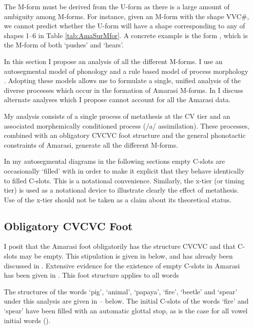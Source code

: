 The M-form must be derived from the U-form
as there is a large amount of ambiguity among M-forms.
For instance, given an M-form with the shape VVC{\#},
we cannot predict whether the U-form will have a shape
corresponding to any of shapes 1--6 in Table \ref{tab:AmaSurMfor}.
A concrete example is the form ,
which is the M-form of both
 `pushes' and  `hears'.

In this section I propose an analysis of all the different M-forms.
I use an autosegmental model of phonology \citep{go76}
and a rule based model of process morphology \citep{ma74,an92}.
Adopting these models allows me to formulate a single, unified
analysis of the diverse processes which occur in the formation of Amarasi M-forms.
In  I discuss alternate analyses
which I propose cannot account for all the Amarasi data.

My analysis consists of a single process of metathesis at the CV tier
and an associated morphemically conditioned process (/a/ assimilation).
These processes, combined with an obligatory CVCVC foot structure
and the general phonotactic constraints of Amarasi,
generate all the different M-forms.

In my autosegmental diagrams in the following sections
empty C-slots are occasionally `filled' with {\0}
in order to make it explicit that they behave identically to filled C-slots.
This is a notational convenience.
Similarly, the x-tier (or timing tier) is used as a notational device to
illustrate clearly the effect of metathesis.
Use of the x-tier should not be taken as a claim about its theoretical status.

\subsection{Obligatory CVCVC Foot}\label{sec:ThePhoRul}
I posit that the Amarasi foot obligatorily has the structure CVCVC
and that C-slots may be empty.
This stipulation is given in  below,
and has already been discussed in .
Extensive evidence for the existence
of empty C-slots in Amarasi has been given in .
This foot structure applies to all words

\begin{exe}
	\label{ex2:Ft.->CVCVC}
\end{exe}

The structures of the words  `pig',  `animal',  `papaya',
 `fire',  `beetle' and  `spear' under this analysis
are given in -- below.
The initial C-slots of the words  `fire' and  `spear'
have been filled with an automatic glottal stop,
as is the case for all vowel initial words ().

